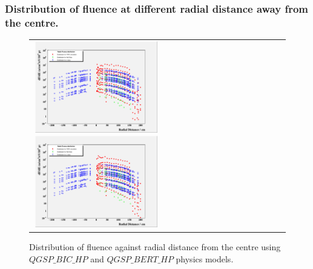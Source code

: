 \documentclass{beamer}
\begin{document}
    \begin{frame}
        \frametitle{Distribution of fluence at different radial distance away from the centre.}
        \begin{figure}
            \begin{tabular}{ll}
                \includegraphics[height=40mm, width=55mm]{../PICS/fluenceRadialBIC.png}\label{flRADBIC}
                \includegraphics[height=40mm, width=55mm]{../PICS/fluenceRadialBERT.png}\label{flRADBERT}
            \end{tabular}
        \caption{Distribution of fluence against radial distance from the centre using $QGSP\_BIC\_HP$ and $QGSP\_BERT\_HP$ physics models.}
        \end{figure}
    \end{frame}
\end{document}
